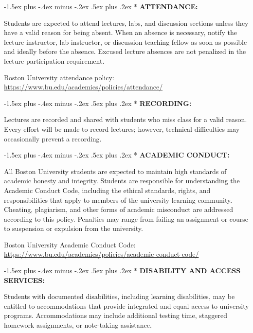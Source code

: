 \documentclass[11pt]{article}
\makeatletter
\renewcommand\section{\@startsection{section}{1}{0pt}%
  {-1.5ex plus -.4ex minus -.2ex}%
  {.5ex plus .2ex}%
  {\normalfont\Large\bfseries}}
\makeatother
\begin{document}
\section*{}
\textbf{ATTENDANCE:}

Students are expected to attend lectures, labs, and discussion sections unless they have a valid reason for being absent. When an absence is necessary, notify the lecture instructor, lab instructor, or discussion teaching fellow as soon as possible and ideally before the absence. Excused lecture absences are not penalized in the lecture participation requirement.

Boston University attendance policy: \url{https://www.bu.edu/academics/policies/attendance/}

\section*{}
\textbf{RECORDING:}

Lectures are recorded and shared with students who miss class for a valid reason. Every effort will be made to record lectures; however, technical difficulties may occasionally prevent a recording.

\section*{}
\textbf{ACADEMIC CONDUCT:}

All Boston University students are expected to maintain high standards of academic honesty and integrity. Students are responsible for understanding the Academic Conduct Code, including the ethical standards, rights, and responsibilities that apply to members of the university learning community. Cheating, plagiarism, and other forms of academic misconduct are addressed according to this policy. Penalties may range from failing an assignment or course to suspension or expulsion from the university.

Boston University Academic Conduct Code: \url{https://www.bu.edu/academics/policies/academic-conduct-code/}

\section*{}
\textbf{DISABILITY AND ACCESS SERVICES:}

Students with documented disabilities, including learning disabilities, may be entitled to accommodations that provide integrated and equal access to university programs. Accommodations may include additional testing time, staggered homework assignments, or note-taking assistance.
\end{document}
